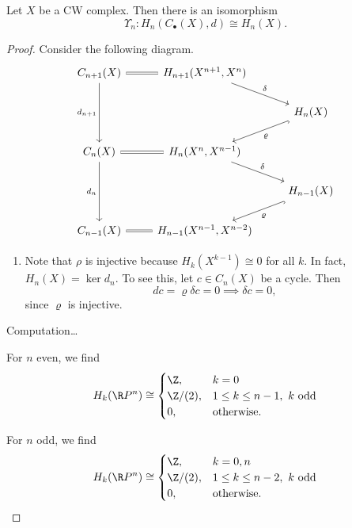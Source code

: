 \documentclass[main.tex]{subfiles}
\begin{document}
\begin{theorem}
  Let $X$ be a CW complex. Then there is an isomorphism
  \begin{equation*}
    \Upsilon_{n}\colon H_{n}(C_{\bullet}(X), d) \cong H_{n}(X).
  \end{equation*}
\end{theorem}
\begin{proof}
  Consider the following diagram.
  \begin{equation*}
    \begin{tikzcd}
      C_{n+1}(X)
      \arrow[dd, swap, "d_{n+1}"]
      \arrow[r, equals]
      & H_{n+1}(X^{n+1}, X^{n})
      \arrow[dr, "\delta"]
      \\
      && H_{n}(X)
      \arrow[dl, hook, "\varrho"]
      \\
      C_{n}(X)
      \arrow[r, equals]
      \arrow[dd, swap, "d_{n}"]
      & H_{n}(X^{n}, X^{n-1})
      \arrow[dr, "\delta"]
      \\
      && H_{n-1}(X)
      \arrow[dl, hook, "\varrho"]
      \\
      C_{n-1}(X)
      \arrow[r, equals]
      & H_{n-1}(X^{n-1}, X^{n-2})
    \end{tikzcd}
  \end{equation*}
  \begin{enumerate}
    \item Note that \(\rho\) is injective because \(H_{k}(X^{k-1}) \cong 0\) for all \(k\). In fact, \(H_{n}(X) = \ker d_{n}\). To see this, let \(c \in C_{n}(X)\) be a cycle. Then
      \begin{equation*}
        dc = \varrho \delta c = 0 \implies \delta c = 0,
      \end{equation*}
      since \(\varrho\) is injective.
  \end{enumerate}

  Computation\dots

  For \(n\) even, we find
  \begin{equation*}
    H_{k}(\R P^{n}) \cong
    \begin{cases}
      \Z, &k = 0 \\
      \Z/(2), & 1 \leq k \leq n-1,\ k \text{ odd} \\
      0, &\text{otherwise}.
    \end{cases}
  \end{equation*}

  For \(n\) odd, we find
  \begin{equation*}
    H_{k}(\R P^{n}) \cong
    \begin{cases}
      \Z, &k = 0, n \\
      \Z/(2), & 1 \leq k \leq n-2,\ k \text{ odd} \\
      0, &\text{otherwise}.
    \end{cases}
  \end{equation*}
\end{proof}
\end{document}
